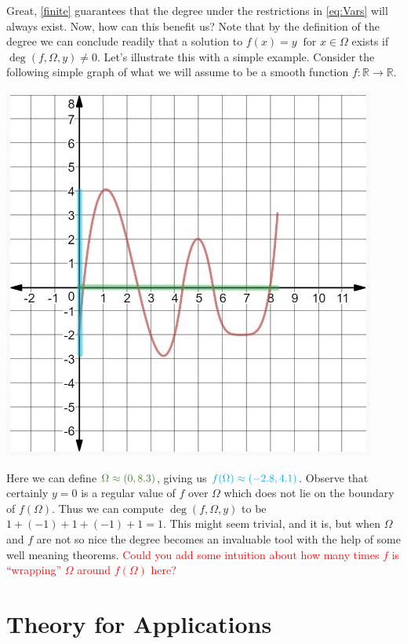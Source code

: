 \documentclass[11pt]{article}
\theoremstyle{plain}
\theoremstyle{definition}
\theoremstyle{remark}
\newcommand{\delete}[1]{\textcolor{red}{#1}}
\begin{document}
Great, \cref{finite} guarantees that the degree under the restrictions in \eqref{eq:Vars} will always exist. Now, how can this benefit us?
Note that by the definition of the degree we can conclude readily that a solution to $f(x)=y \ \text{ for } x\in\Omega$ exists if $\operatorname{deg}\left(f,\Omega,y\right)\neq 0$. Let's illustrate this with a simple example. Consider the following simple graph of what we will assume to be a smooth function $f:\mathbb{R}\rightarrow\mathbb{R}$. 
\begin{center}
\includegraphics[]{Figures/Curveb}
\end{center}

Here we can define $\color{OliveGreen}{\Omega\approx (0,8.3)}$, giving us $\color{Cyan}{f(\Omega)\approx (-2.8,4.1)}$.
Observe that certainly $y=0$ is a regular value of $f$ over $\Omega$ which does not lie on the boundary of $f(\Omega)$.
Thus we can compute $\operatorname{deg}\left(f,\Omega,y\right)$ to be $1+(-1)+1+(-1)+1=1$.
This might seem trivial, and it is, but when $\Omega$ and $f$ are not so nice the degree becomes an invaluable tool with the help of some well meaning theorems.
\delete{Could you add some intuition about how many times $f$ is ``wrapping'' $\Omega$ around $f(\Omega)$ here?}
  


\section{Theory for Applications}
\end{document}
